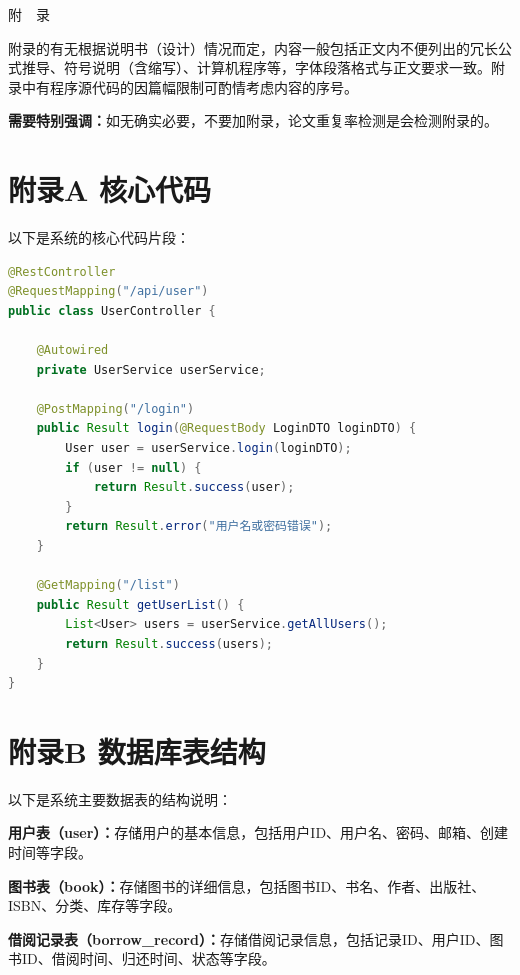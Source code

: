 \documentclass[a4paper,12pt,openany,twoside]{ctexbook}
\begin{document}
\clearpage
{}
{}

\begin{center}
    {\heiti{}附~~录}
\end{center}

附录的有无根据说明书（设计）情况而定，内容一般包括正文内不便列出的冗长公式推导、符号说明（含缩写）、计算机程序等，字体段落格式与正文要求一致。附录中有程序源代码的因篇幅限制可酌情考虑内容的序号。

\textbf{需要特别强调：}如无确实必要，不要加附录，论文重复率检测是会检测附录的。

\section*{附录A 核心代码}

以下是系统的核心代码片段：

\begin{lstlisting}[language=Java, caption=用户控制器代码]
@RestController
@RequestMapping("/api/user")
public class UserController {
    
    @Autowired
    private UserService userService;
    
    @PostMapping("/login")
    public Result login(@RequestBody LoginDTO loginDTO) {
        User user = userService.login(loginDTO);
        if (user != null) {
            return Result.success(user);
        }
        return Result.error("用户名或密码错误");
    }
    
    @GetMapping("/list")
    public Result getUserList() {
        List<User> users = userService.getAllUsers();
        return Result.success(users);
    }
}
\end{lstlisting}

\section*{附录B 数据库表结构}

以下是系统主要数据表的结构说明：

\textbf{用户表（user）：}存储用户的基本信息，包括用户ID、用户名、密码、邮箱、创建时间等字段。

\textbf{图书表（book）：}存储图书的详细信息，包括图书ID、书名、作者、出版社、ISBN、分类、库存等字段。

\textbf{借阅记录表（borrow\_record）：}存储借阅记录信息，包括记录ID、用户ID、图书ID、借阅时间、归还时间、状态等字段。
\end{document}

